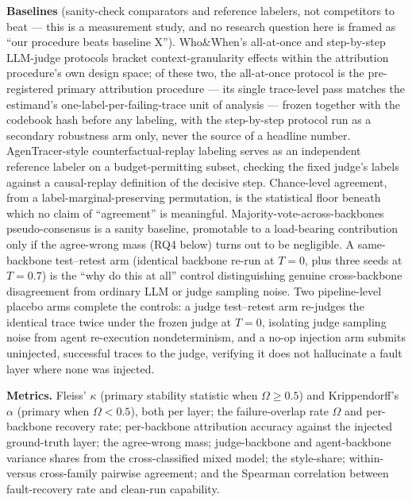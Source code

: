 \documentclass[11pt]{article}
\begin{document}
\textbf{Baselines} (sanity-check comparators and reference labelers, not competitors to beat --- this is a measurement study, and no research question here is framed as ``our procedure beats baseline X''). Who\&When's \citep{WhoWhen2025} all-at-once and step-by-step LLM-judge protocols bracket context-granularity effects within the attribution procedure's own design space; of these two, the all-at-once protocol is the pre-registered primary attribution procedure --- its single trace-level pass matches the estimand's one-label-per-failing-trace unit of analysis --- frozen together with the codebook hash before any labeling, with the step-by-step protocol run as a secondary robustness arm only, never the source of a headline number. AgenTracer-style \citep{AgenTracer2025} counterfactual-replay labeling serves as an independent reference labeler on a budget-permitting subset, checking the fixed judge's labels against a causal-replay definition of the decisive step. Chance-level agreement, from a label-marginal-preserving permutation, is the statistical floor beneath which no claim of ``agreement'' is meaningful. Majority-vote-across-backbones pseudo-consensus is a sanity baseline, promotable to a load-bearing contribution only if the agree-wrong mass (RQ4 below) turns out to be negligible. A same-backbone test--retest arm (identical backbone re-run at $T=0$, plus three seeds at $T=0.7$) is the ``why do this at all'' control distinguishing genuine cross-backbone disagreement from ordinary LLM or judge sampling noise. Two pipeline-level placebo arms complete the controls: a judge test--retest arm re-judges the identical trace twice under the frozen judge at $T=0$, isolating judge sampling noise from agent re-execution nondeterminism, and a no-op injection arm submits uninjected, successful traces to the judge, verifying it does not hallucinate a fault layer where none was injected.

\textbf{Metrics.} Fleiss' $\kappa$ (primary stability statistic when $\Omega \geq 0.5$) and Krippendorff's $\alpha$ (primary when $\Omega < 0.5$), both per layer; the failure-overlap rate $\Omega$ and per-backbone recovery rate; per-backbone attribution accuracy against the injected ground-truth layer; the agree-wrong mass; judge-backbone and agent-backbone variance shares from the cross-classified mixed model; the style-share; within- versus cross-family pairwise agreement; and the Spearman correlation between fault-recovery rate and clean-run capability.
\end{document}
